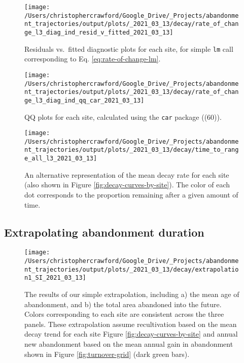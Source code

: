 \documentclass[9pt,twocolumn,twoside,]{pnas-new}
\begin{document}
\begin{figure}
\texttt{[image: /Users/christophercrawford/Google\_Drive/\_Projects/abandonment\_trajectories/output/plots/\_2021\_03\_13/decay/rate\_of\_change\_l3\_diag\_ind\_resid\_v\_fitted\_2021\_03\_13]} \caption{Residuals vs.~fitted diagnostic plots for each site, for simple \texttt{lm} call corresponding to Eq. \eqref{eq:rate-of-change-lm}.}\label{fig:rate-of-change-diag-resid-fitted}
\end{figure}



\begin{figure}
\texttt{[image: /Users/christophercrawford/Google\_Drive/\_Projects/abandonment\_trajectories/output/plots/\_2021\_03\_13/decay/rate\_of\_change\_l3\_diag\_ind\_qq\_car\_2021\_03\_13]} \caption{QQ plots for each site, calculated using the \texttt{car} package ((60)).}\label{fig:rate-of-change-diag-qq}
\end{figure}



\begin{figure}
\texttt{[image: /Users/christophercrawford/Google\_Drive/\_Projects/abandonment\_trajectories/output/plots/\_2021\_03\_13/decay/time\_to\_range\_all\_l3\_2021\_03\_13]} \caption{An alternative representation of the mean decay rate for each site (also shown in Figure \ref{fig:decay-curves-by-site}). The color of each dot corresponds to the proportion remaining after a given amount of time.}\label{fig:decay-time-to-range}
\end{figure}

\newpage

\hypertarget{section-extrapolation-si}{%
\subsection{Extrapolating abandonment duration}\label{section-extrapolation-si}}



\begin{figure}
\texttt{[image: /Users/christophercrawford/Google\_Drive/\_Projects/abandonment\_trajectories/output/plots/\_2021\_03\_13/decay/extrapolation1\_SI\_2021\_03\_13]} \caption{The results of our simple extrapolation, including a) the mean age of abandonment, and b) the total area abandoned into the future. Colors corresponding to each site are consistent across the three panels. These extrapolation assume recultivation based on the mean decay trend for each site Figure \ref{fig:decay-curves-by-site} and annual new abandonment based on the mean annual gain in abandonment shown in Figure \ref{fig:turnover-grid} (dark green bars).}\label{fig:extrapolation-combo}
\end{figure}
\end{document}
